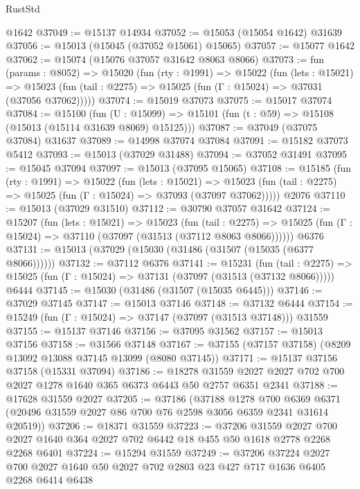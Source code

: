 \begin{lexlean}{RustStd}
\begin{coremodule}
    @1642
@37049 := @15137 @14934
@37052 := @15053 (@15054 @1642) @31639
@37056 := @15013 (@15045 (@37052 @15061) @15065)
@37057 := @15077 @1642
@37062 := @15074 (@15076 @37057 @31642 @8063 @8066)
@37073 := fun (params : @8052) =>
  @15020
    (fun (rty : @1991) =>
    @15022
      (fun (lets : @15021) =>
      @15023 (fun (tail : @2275) => @15025 (fun (Γ : @15024) => @37031 (@37056 @37062)))))
@37074 := @15019 @37073
@37075 := @15017 @37074
@37084 := @15100
    (fun (U : @15099) => @15101 (fun (t : @59) => @15108 (@15013 (@15114 @31639 @8069) @15125)))
@37087 := @37049 (@37075 @37084) @31637
@37089 := @14998 @37074 @37084
@37091 := @15182 @37073 @5412
@37093 := @15013 (@37029 @31488)
@37094 := @37052 @31491
@37095 := @15045 @37094
@37097 := @15013 (@37095 @15065)
@37108 := @15185
    (fun (rty : @1991) =>
    @15022
      (fun (lets : @15021) =>
      @15023 (fun (tail : @2275) => @15025 (fun (Γ : @15024) => @37093 (@37097 @37062)))))
    @2076
@37110 := @15013 (@37029 @31510)
@37112 := @30790 @37057 @31642
@37124 := @15207
    (fun (lets : @15021) =>
    @15023
      (fun (tail : @2275) =>
      @15025 (fun (Γ : @15024) => @37110 (@37097 (@31513 (@37112 @8063 @8066))))))
    @6376
@37131 := @15013 (@37029 (@15030 (@31486 (@31507 (@15035 (@6377 @8066))))))
@37132 := @37112 @6376
@37141 := @15231
    (fun (tail : @2275) => @15025 (fun (Γ : @15024) => @37131 (@37097 (@31513 (@37132 @8066)))))
    @6444
@37145 := @15030 (@31486 (@31507 (@15035 @6445)))
@37146 := @37029 @37145
@37147 := @15013 @37146
@37148 := @37132 @6444
@37154 := @15249 (fun (Γ : @15024) => @37147 (@37097 (@31513 @37148))) @31559
@37155 := @15137 @37146
@37156 := @37095 @31562
@37157 := @15013 @37156
@37158 := @31566 @37148
@37167 := @37155 (@37157 @37158) (@8209 @13092 @13088 @37145 @13099 (@8080 @37145))
@37171 := @15137 @37156 @37158 (@15331 @37094)
@37186 := @18278
    @31559
    @2027
    @2027
    @702
    @700
    @2027
    @1278
    @1640
    @365
    @6373
    @6443
    @50
    @2757
    @6351
    @2341
@37188 := @17628 @31559 @2027
@37205 := @37186
    (@37188
      @1278
      @700
      @6369
      @6371
      (@20496 @31559 @2027 @86 @700 @76 @2598 @3056 @6359 @2341 @31614 @20519))
@37206 := @18371 @31559
@37223 := @37206
    @31559
    @2027
    @700
    @2027
    @1640
    @364
    @2027
    @702
    @6442
    @18
    @455
    @50
    @1618
    @2778
    @2268
    @2268
    @6401
@37224 := @15294 @31559
@37249 := @37206
    @37224
    @2027
    @700
    @2027
    @1640
    @50
    @2027
    @702
    @2803
    @23
    @427
    @717
    @1636
    @6405
    @2268
    @6414
    @6438

\end{coremodule}
\end{lexlean}
